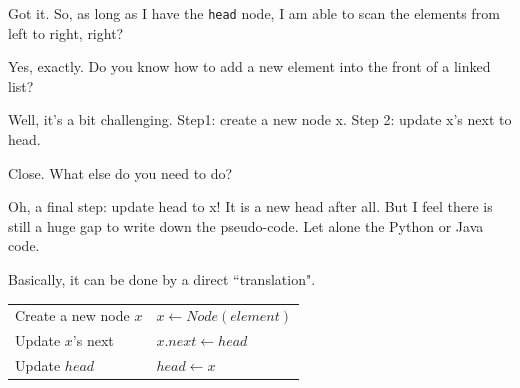 \documentclass[aspectratio=169, 14pt]{beamer}
\begin{document}
\begin{frame}[fragile]

	\begin{leftbubbles}
		Got it. So, as long as I have the \alert{\texttt{head}} node, I am able to scan the elements from left to right, right?
	\end{leftbubbles}

	\begin{rightbubbles}
		Yes, exactly. Do you know how to add a new element into the front of a linked list?
	\end{rightbubbles}

	\begin{leftbubbles}
		Well, it's a bit challenging. Step1: create a new node \alert{x}. Step 2: update \alert{x}'s next to \alert{head}.
	\end{leftbubbles}

	\begin{rightbubbles}
		Close. What else do you need to do?
	\end{rightbubbles}

\end{frame}

\begin{frame}

	\begin{leftbubbles}
		Oh, a final step: update \alert{head} to \alert{x}! It is a new head after all. But I feel there is still a huge gap to write down the pseudo-code. Let alone the Python or Java code.
	\end{leftbubbles}

	\begin{rightbubbles}
		Basically, it can be done by a direct ``translation".
	\end{rightbubbles}
	\begin{table}
		\begin{tabular}{ll}
			\toprule
			Create a new node $x$ & $x \gets Node(element)$ \\
			Update $x$'s next     & $x.next \gets head$     \\
			Update $head$         & $head \gets x$          \\
			\bottomrule
		\end{tabular}
	\end{table}

\end{frame}
\end{document}
